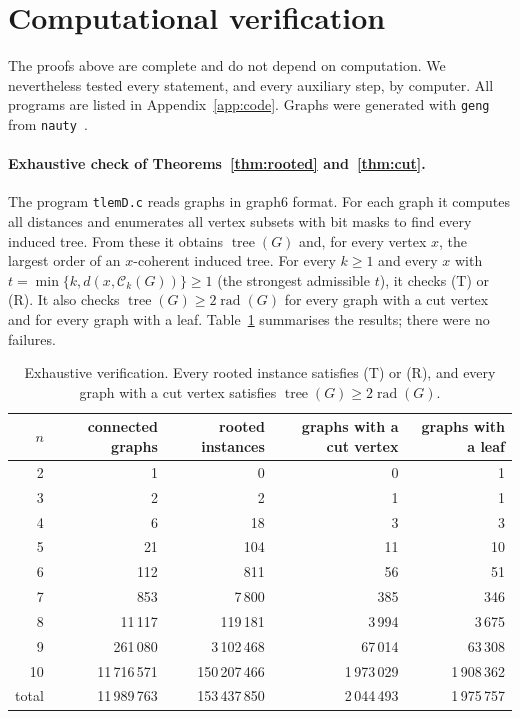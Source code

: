 \documentclass[11pt,a4paper]{article}
\theoremstyle{definition}
\newcommand{\rad}{\operatorname{rad}}
\newcommand{\tr}{\operatorname{tree}}
\newcommand{\C}{\mathcal{C}}
\begin{document}
\section{Computational verification}\label{sec:comp}

The proofs above are complete and do not depend on computation. We nevertheless tested every statement, and every auxiliary step, by computer. All programs are listed in Appendix~\ref{app:code}. Graphs were generated with \texttt{geng} from \texttt{nauty}~\cite{MP14}.

\paragraph{Exhaustive check of Theorems~\ref{thm:rooted} and~\ref{thm:cut}.} The program \texttt{tlemD.c} reads graphs in graph6 format. For each graph it computes all distances and enumerates all vertex subsets with bit masks to find every induced tree. From these it obtains $\tr(G)$ and, for every vertex $x$, the largest order of an $x$-coherent induced tree. For every $k\ge1$ and every $x$ with $t=\min\{k,d(x,\C_k(G))\}\ge1$ (the strongest admissible $t$), it checks (T) or (R). It also checks $\tr(G)\ge2\rad(G)$ for every graph with a cut vertex and for every graph with a leaf. Table~\ref{tab:exh} summarises the results; there were no failures.

\begin{table}[h]
\centering
\begin{tabular}{rrrrr}
\toprule
$n$ & connected graphs & rooted instances & graphs with a cut vertex & graphs with a leaf\\
\midrule
2 & 1 & 0 & 0 & 1\\
3 & 2 & 2 & 1 & 1\\
4 & 6 & 18 & 3 & 3\\
5 & 21 & 104 & 11 & 10\\
6 & 112 & 811 & 56 & 51\\
7 & 853 & 7\,800 & 385 & 346\\
8 & 11\,117 & 119\,181 & 3\,994 & 3\,675\\
9 & 261\,080 & 3\,102\,468 & 67\,014 & 63\,308\\
10 & 11\,716\,571 & 150\,207\,466 & 1\,973\,029 & 1\,908\,362\\
\midrule
total & 11\,989\,763 & 153\,437\,850 & 2\,044\,493 & 1\,975\,757\\
\bottomrule
\end{tabular}
\caption{Exhaustive verification. Every rooted instance satisfies (T) or (R), and every graph with a cut vertex satisfies $\tr(G)\ge2\rad(G)$.}\label{tab:exh}
\end{table}
\end{document}
